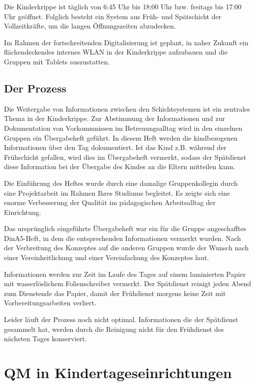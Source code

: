Die Kinderkrippe ist täglich von 6:45 Uhr bis 18:00 Uhr bzw. freitags bis 17:00 Uhr geöffnet. Folglich besteht ein System aus Früh- und Spätschicht der Vollzeitkräfte, um die langen Öffnungszeiten abzudecken.

Im Rahmen der fortschreitenden Digitalisierung ist geplant, in naher Zukunft ein flächendeckendes internes WLAN in der Kinderkrippe aufzubauen und die Gruppen mit Tablets auszustatten.

\subsection{Der Prozess}

Die Weitergabe von Informationen zwischen den Schichtsystemen ist ein zentrales Thema in der Kinderkrippe.
Zur Abstimmung der Informationen und zur Dokumentation von Vorkommnissen im Betreuungsalltag wird in den einzelnen Gruppen ein Übergabeheft geführt. In diesem Heft werden die kindbezogenen Informationen über den Tag dokumentiert. Ist das Kind z.B. während der Frühschicht gefallen, wird dies im Übergabeheft vermerkt, sodass der Spätdienst diese Information bei der Übergabe des Kindes an die Eltern mitteilen kann.

Die Einführung des Heftes wurde durch eine damalige Gruppenkollegin durch eine Projektarbeit im Rahmen Ihres Studiums begleitet. Es zeigte sich eine enorme Verbesserung der Qualität im pädagogischen Arbeitsalltag der Einrichtung.

Das ursprünglich eingeführte Übergabeheft war ein für die Gruppe angeschafftes DinA5-Heft, in dem die entsprechenden Informationen vermerkt wurden. Nach der Verbreitung des Konzeptes auf die anderen Gruppen wurde der Wunsch nach einer Vereinheitlichung und einer Vereinfachung des Konzeptes laut.

Informationen werden zur Zeit im Laufe des Tages auf einem laminierten Papier mit wasserlöslichem Folienschreiber vermerkt. Der Spätdienst reinigt jeden Abend zum Dienstende das Papier, damit der Frühdienst morgens keine Zeit mit Vorbereitungsarbeiten verliert.

Leider läuft der Prozess noch nicht optimal. 
Informationen die der Spätdienst gesammelt hat, werden durch die Reinigung nicht für den Frühdienst des nächsten Tages konserviert. 


\section{QM in Kindertageseinrichtungen}

